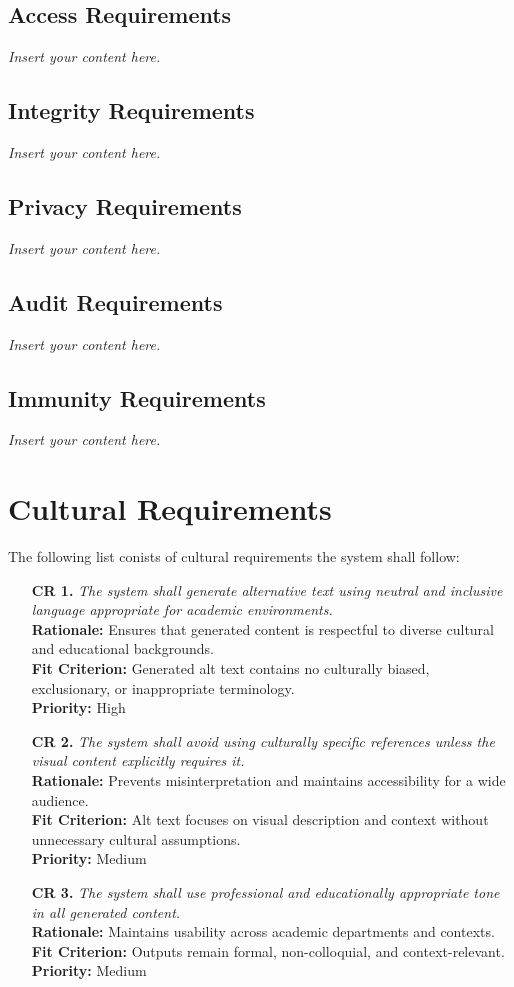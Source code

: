 \documentclass[12pt]{article}
\newcommand{\lips}{\textit{Insert your content here.}}
\begin{document}
\subsection{Access Requirements}
\lips
\subsection{Integrity Requirements}
\lips
\subsection{Privacy Requirements}
\lips
\subsection{Audit Requirements}
\lips
\subsection{Immunity Requirements}
\lips

\section{Cultural Requirements}
The following list conists of cultural requirements the system shall follow:
\begin{itemize}
  \item[\textbf{CR 1.}] \textit{The system shall generate alternative
      text using neutral and inclusive language appropriate for
    academic environments.}\\
    \textbf{Rationale:} Ensures that generated content is respectful
    to diverse cultural and educational backgrounds.\\
    \textbf{Fit Criterion:} Generated alt text contains no culturally
    biased, exclusionary, or inappropriate terminology.\\
    \textbf{Priority:} High

  \item[\textbf{CR 2.}] \textit{The system shall avoid using
      culturally specific references unless the visual content
    explicitly requires it.}\\
    \textbf{Rationale:} Prevents misinterpretation and maintains
    accessibility for a wide audience.\\
    \textbf{Fit Criterion:} Alt text focuses on visual description
    and context without unnecessary cultural assumptions.\\
    \textbf{Priority:} Medium

  \item[\textbf{CR 3.}] \textit{The system shall use professional and
    educationally appropriate tone in all generated content.}\\
    \textbf{Rationale:} Maintains usability across academic
    departments and contexts.\\
    \textbf{Fit Criterion:} Outputs remain formal, non-colloquial,
    and context-relevant.\\
    \textbf{Priority:} Medium
\end{itemize}
\end{document}
